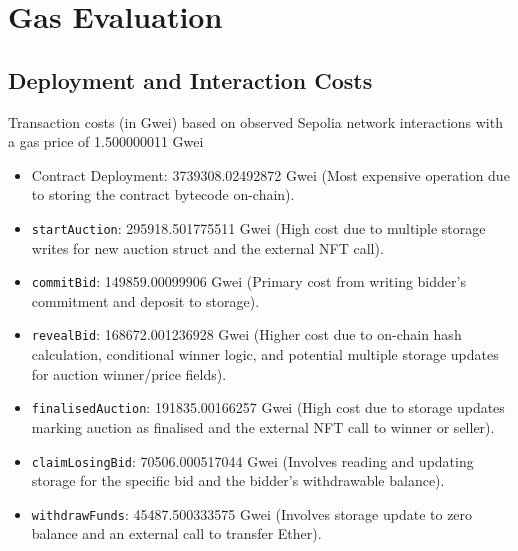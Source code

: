 \documentclass[11pt, a4paper]{article}
\begin{document}
\section{Gas Evaluation}
\subsection{Deployment and Interaction Costs}
Transaction costs (in Gwei) based on observed Sepolia network interactions with a gas price of 1.500000011 Gwei
\begin{itemize}
    \item Contract Deployment: 3739308.02492872 Gwei (Most expensive operation due to storing the contract bytecode on-chain).
    \item \texttt{startAuction}: 295918.501775511 Gwei (High cost due to multiple storage writes for new auction struct and the external NFT \texttt{} call).
    \item \texttt{commitBid}: 149859.00099906 Gwei (Primary cost from writing bidder's commitment and deposit to storage).
    \item \texttt{revealBid}: 168672.001236928 Gwei (Higher cost due to on-chain hash calculation, conditional winner logic, and potential multiple storage updates for auction winner/price fields).
    \item \texttt{finalisedAuction}: 191835.00166257 Gwei (High cost due to storage updates marking auction as finalised and the external NFT \texttt{} call to winner or seller).
    \item \texttt{claimLosingBid}: 70506.000517044 Gwei (Involves reading and updating storage for the specific bid and the bidder's withdrawable balance).
    \item \texttt{withdrawFunds}: 45487.500333575 Gwei (Involves storage update to zero balance and an external call to transfer Ether).
\end{itemize}
\end{document}
